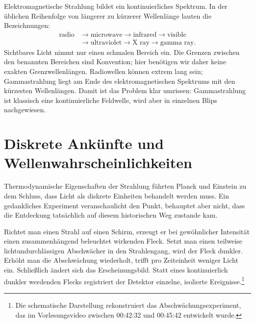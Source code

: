 Elektromagnetische Strahlung bildet ein kontinuierliches Spektrum. In der üblichen Reihenfolge von längerer zu kürzerer Wellenlänge lauten die Bezeichnungen:
\begin{equation}
\begin{aligned}
\text{radio}
&\longrightarrow \text{microwave}
\longrightarrow \text{infrared}
\longrightarrow \text{visible}\\
&\longrightarrow \text{ultraviolet}
\longrightarrow \text{X ray}
\longrightarrow \text{gamma ray}.
\end{aligned}
\end{equation}
Sichtbares Licht nimmt nur einen schmalen Bereich ein. Die Grenzen zwischen den benannten Bereichen sind Konvention; hier benötigen wir daher keine exakten Grenzwellenlängen. Radiowellen können extrem lang sein; Gammastrahlung liegt am Ende des elektromagnetischen Spektrums mit den kürzesten Wellenlängen. Damit ist das Problem klar umrissen: Gammastrahlung ist klassisch eine kontinuierliche Feldwelle, wird aber in einzelnen Blips nachgewiesen.

\section{Diskrete Ankünfte und Wellenwahrscheinlichkeiten}

Thermodynamische Eigenschaften der Strahlung führten Planck und Einstein zu dem Schluss, dass Licht als diskrete Einheiten behandelt werden muss. Ein gedankliches Experiment veranschaulicht den Punkt, behauptet aber nicht, dass die Entdeckung tatsächlich auf diesem historischen Weg zustande kam.

Richtet man einen Strahl auf einen Schirm, erzeugt er bei gewöhnlicher Intensität einen zusammenhängend beleuchtet wirkenden Fleck. Setzt man einen teilweise lichtundurchlässigen Abschwächer in den Strahlengang, wird der Fleck dunkler. Erhöht man die Abschwächung wiederholt, trifft pro Zeiteinheit weniger Licht ein. Schließlich ändert sich das Erscheinungsbild. Statt eines kontinuierlich dunkler werdenden Flecks registriert der Detektor einzelne, isolierte Ereignisse.\footnote{Die schematische Darstellung rekonstruiert das Abschwächungsexperiment, das im Vorlesungsvideo zwischen 00:42:32 und 00:45:42 entwickelt wurde.}

